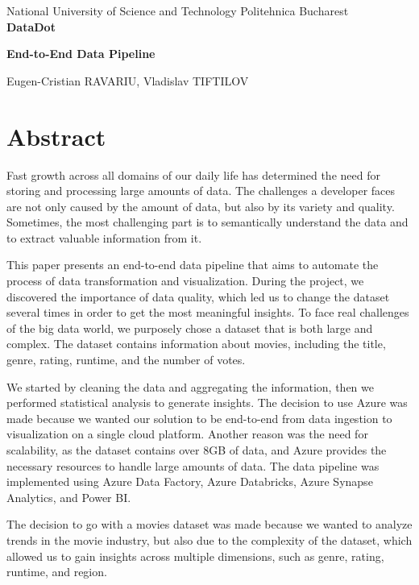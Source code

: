 \documentclass[a4paper,12pt]{article}
\author{Eugen-Cristian RAVARIU, Vladislav TIFTILOV}
\begin{document}
\begin{titlepage}
    \centering
    National University of Science and Technology Politehnica Bucharest\\
    \vfill
    {\bfseries\fontsize{14pt}{14pt} DataDot}\par
    \vspace{0.5cm}
    {\bfseries\fontsize{12pt}{12pt} End-to-End Data Pipeline}\par
    \vspace{2.5cm}
    Eugen-Cristian RAVARIU, Vladislav TIFTILOV\\
    \vfill
    \date{\today}
\end{titlepage}

\section{Abstract}
\label{sec:abstract}

Fast growth across all domains of our daily life has determined the need for storing and processing 
large amounts of data. The challenges a developer faces are not only caused by the amount of data, 
but also by its variety and quality. Sometimes, the most challenging part is to semantically understand 
the data and to extract valuable information from it.

This paper presents an end-to-end data pipeline that aims to automate the process of data transformation 
and visualization. During the project, we discovered the importance of data quality, which led us to change 
the dataset several times in order to get the most meaningful insights. To face real challenges of the 
big data world, we purposely chose a dataset that is both large and complex. The dataset contains 
information about movies, including the title, genre, rating, runtime, and the number of votes.

We started by cleaning the data and aggregating the information, then we performed statistical 
analysis to generate insights. The decision to use Azure was made because we wanted our solution 
to be end-to-end from data ingestion to visualization on a single cloud platform. Another reason 
was the need for scalability, as the dataset contains over 8GB of data, and Azure provides the 
necessary resources to handle large amounts of data. The data pipeline was implemented using 
Azure Data Factory, Azure Databricks, Azure Synapse Analytics, and Power BI.

The decision to go with a movies dataset was made because we wanted to analyze trends in 
the movie industry, but also due to the complexity of the dataset, which allowed us to gain 
insights across multiple dimensions, such as genre, rating, runtime, and region.
\end{document}
